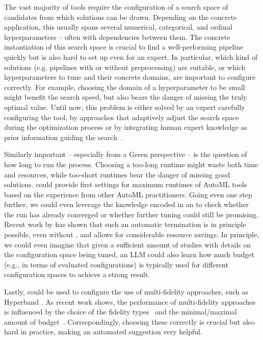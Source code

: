 \documentclass[10pt]{article} %
\begin{document}
The vast majority of \AutoML tools require the configuration of a search space of candidates from which solutions can be drawn. Depending on the concrete application, this usually spans several numerical, categorical, and ordinal hyperparameters -- often with dependencies between them. The concrete instantiation of this search space is crucial to find a well-performing pipeline quickly but is also hard to set up even for an expert. In particular, which kind of solutions (e.g. pipelines with or without preprocessing) are suitable, or which hyperparameters to tune and their concrete domains, are important to configure correctly. For example, choosing the domain of a hyperparameter to be small might benefit the search speed, but also bears the danger of missing the truly optimal value. Until now, this problem is either solved by an expert carefully configuring the \AutoML tool, by approaches that adaptively adjust the search space during the optimization process \citep{wistuba-ecml15a,nguyen-knowinfsys19a,hu-ieeetnnls22a,hu-eccv20a,chen-iccv19} or by integrating human expert knowledge as prior information guiding the search~\citep{souza-ecmlpkdd21a,hvarfner-iclr22a,mallik-metaws22a}.

Similarly important -- especially from a Green \AutoML perspective \citep{tornede-jair23a} -- is the question of how long to run the \AutoML process. Choosing a too-long runtime might waste both time and resources, while too-short runtimes bear the danger of missing good solutions. \LLMs could provide first settings for maximum runtimes of AutoML tools based on the experience from other AutoML practitioners. Going even one step further, we could even leverage the knowledge encoded in an \LLM to check whether the \AutoML run has already converged or whether further tuning could still be promising. Recent work by \citet{makarova-automlconf22a} has shown that such an automatic termination is in principle possible, even without \LLMs, and allows for considerable resource savings. In principle, we could even imagine that given a sufficient amount of \AutoML studies with details on the configuration space being tuned, an LLM could also learn how much \AutoML budget (e.g., in terms of evaluated configurations) is typically used for different configuration spaces to achieve a strong result.

Lastly, \LLMs could be used to configure the use of multi-fidelity approaches, such as Hyperband \citep{li-jmlr18a}. As recent work shows, the performance of multi-fidelity approaches is influenced by the choice of the fidelity types~\citep{deng-ecml22a} and the minimal/maximal amount of budget~\citep{bohdal-iclr2023a}. Correspondingly, choosing these correctly is crucial but also hard in practice, making an automated suggestion very helpful.
\end{document}
